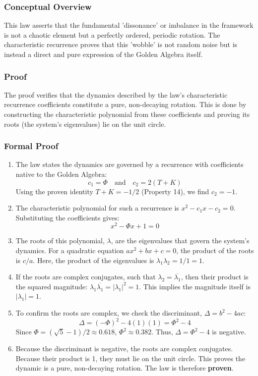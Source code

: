 \subsubsection*{Conceptual Overview}
This law asserts that the fundamental 'dissonance' or imbalance in the framework is not a chaotic element but a perfectly ordered, periodic rotation. The characteristic recurrence proves that this 'wobble' is not random noise but is instead a direct and pure expression of the Golden Algebra itself.

\subsubsection*{Proof}
The proof verifies that the dynamics described by the law's characteristic recurrence coefficients constitute a pure, non-decaying rotation. This is done by constructing the characteristic polynomial from these coefficients and proving its roots (the system's eigenvalues) lie on the unit circle.

\subsubsection*{Formal Proof}
\begin{enumerate}
    \item The law states the dynamics are governed by a recurrence with coefficients native to the Golden Algebra:
    $$ c_1 = \Phi \quad \text{and} \quad c_2 = 2(T+K) $$
    Using the proven identity $T+K = -1/2$ (Property 14), we find $c_2 = -1$.
    
    \item The characteristic polynomial for such a recurrence is $x^2 - c_1x - c_2 = 0$. Substituting the coefficients gives:
    $$ x^2 - \Phi x + 1 = 0 $$
    
    \item The roots of this polynomial, $\lambda$, are the eigenvalues that govern the system's dynamics. For a quadratic equation $ax^2+bx+c=0$, the product of the roots is $c/a$. Here, the product of the eigenvalues is $\lambda_1 \lambda_2 = 1/1 = 1$.
    
    \item If the roots are complex conjugates, such that $\lambda_2 = \overline{\lambda_1}$, then their product is the squared magnitude: $\lambda_1 \overline{\lambda_1} = |\lambda_1|^2 = 1$. This implies the magnitude itself is $|\lambda_1|=1$.
    
    \item To confirm the roots are complex, we check the discriminant, $\Delta = b^2 - 4ac$:
    $$ \Delta = (-\Phi)^2 - 4(1)(1) = \Phi^2 - 4 $$
    Since $\Phi = (\sqrt{5}-1)/2 \approx 0.618$, $\Phi^2 \approx 0.382$. Thus, $\Delta = \Phi^2 - 4$ is negative.
    
    \item Because the discriminant is negative, the roots are complex conjugates. Because their product is 1, they must lie on the unit circle. This proves the dynamic is a pure, non-decaying rotation. The law is therefore \textbf{proven}.
\end{enumerate}

